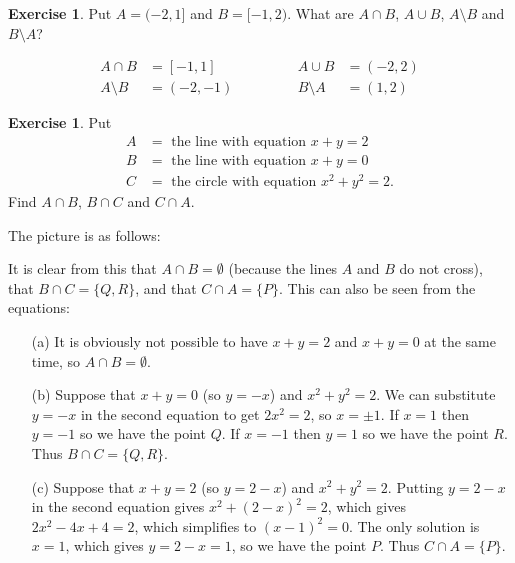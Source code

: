 \documentclass[a4paper]{book}
\newcommand{\sm}        {\setminus}
\renewcommand{\:}{\colon}
\theoremstyle{definition}
\newtheorem{exercise}[theorem]{Exercise}
\renewenvironment{solution}{\SolutionInline}{\endSolutionInline}
\begin{document}
\begin{exercise}
 Put $A=(-2,1]$ and $B=[-1,2)$.  What are $A\cap B$, $A\cup B$,
 $A\sm B$ and $B\sm A$?
\end{exercise}
\begin{solution}
 \[ \begin{array}{rlcrl}
  A\cap B &= [-1,1]  &\hspace{3em}& A\cup B &= (-2,2) \\
  A\sm B  &= (-2,-1) && B \sm A &=(1,2)
 \end{array} \]
\end{solution}
\begin{exercise}
 Put 
 \begin{align}
  A &= \text{ the line with equation } x+y=2  \\
  B &= \text{ the line with equation } x+y=0  \\
  C &= \text{ the circle with equation } x^2+y^2=2.
 \end{align}
 Find $A\cap B$, $B\cap C$ and $C\cap A$.
\end{exercise}
\begin{solution}
 The picture is as follows:
 \begin{center}
 \end{center}
 It is clear from this that $A\cap B=\emptyset$ (because the lines $A$
 and $B$ do not cross), that $B\cap C=\{Q,R\}$, and that
 $C\cap A=\{P\}$.  This can also be seen from the equations:
 \begin{itemize}
  \item[(a)] It is obviously not possible to have $x+y=2$ and $x+y=0$
   at the same time, so $A\cap B=\emptyset$.
  \item[(b)] Suppose that $x+y=0$ (so $y=-x$) and $x^2+y^2=2$.  We can
   substitute $y=-x$ in the second equation to get $2x^2=2$, so
   $x=\pm 1$.  If $x=1$ then $y=-1$ so we have the point $Q$.  If
   $x=-1$ then $y=1$ so we have the point $R$.  Thus $B\cap C=\{Q,R\}$.
  \item[(c)] Suppose that $x+y=2$ (so $y=2-x$) and $x^2+y^2=2$.
   Putting $y=2-x$ in the second equation gives $x^2+(2-x)^2=2$, which
   gives $2x^2-4x+4=2$, which simplifies to $(x-1)^2=0$.  The only
   solution is $x=1$, which gives $y=2-x=1$, so we have the point
   $P$.  Thus $C\cap A=\{P\}$.
 \end{itemize}
\end{solution}
\end{document}
